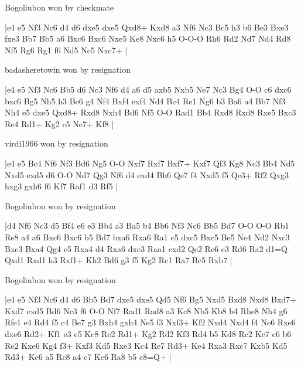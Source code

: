 \showboard

Bogoliubon won by checkmate

\makegametitle
|e4 e5 Nf3 Nc6 d4 d6 dxe5 dxe5 Qxd8+ Kxd8 a3 Nf6 Nc3 Bc5 h3 b6 Be3 Bxe3 fxe3 Bb7 Bb5 a6 Bxc6 Bxc6 Nxe5 Ke8 Nxc6 h5 O-O-O Rh6 Rd2 Nd7 Nd4 Rd8 Nf5 Rg6 Rg1 f6 Nd5 Nc5 Nxc7+  |

\showboard

badasheretowin won by resignation

\makegametitle
|e4 e5 Nf3 Nc6 Bb5 d6 Nc3 Nf6 d4 a6 d5 axb5 Nxb5 Ne7 Nc3 Bg4 O-O c6 dxc6 bxc6 Bg5 Nh5 h3 Be6 g4 Nf4 Bxf4 exf4 Nd4 Bc4 Re1 Ng6 b3 Ba6 a4 Bb7 Nf3 Nh4 e5 dxe5 Qxd8+ Rxd8 Nxh4 Bd6 Nf5 O-O Rad1 Bb4 Rxd8 Rxd8 Rxe5 Bxc3 Re4 Rd1+ Kg2 c5 Ne7+ Kf8  |

\showboard

virdi1966 won by resignation

\makegametitle
|e4 e5 Bc4 Nf6 Nf3 Bd6 Ng5 O-O Nxf7 Rxf7 Bxf7+ Kxf7 Qf3 Kg8 Nc3 Bb4 Nd5 Nxd5 exd5 d6 O-O Nd7 Qg3 Nf6 d4 exd4 Bh6 Qe7 f4 Nxd5 f5 Qe3+ Rf2 Qxg3 hxg3 gxh6 f6 Kf7 Raf1 d3 Rf5  |

\showboard

Bogoliubon won by resignation

\makegametitle
|d4 Nf6 Nc3 d5 Bf4 e6 e3 Bb4 a3 Ba5 b4 Bb6 Nf3 Nc6 Bb5 Bd7 O-O O-O Rb1 Re8 a4 a6 Bxc6 Bxc6 b5 Bd7 bxa6 Rxa6 Ra1 c5 dxc5 Bxc5 Be5 Ne4 Nd2 Nxc3 Bxc3 Bxa4 Qg4 e5 Rxa4 d4 Rxa6 dxc3 Raa1 cxd2 Qe2 Re6 c3 Rd6 Ra2 d1=Q Qxd1 Rxd1 h3 Rxf1+ Kh2 Bd6 g3 f5 Kg2 Rc1 Ra7 Bc5 Rxb7  |

\showboard

Bogoliubon won by resignation

\makegametitle
|e4 e5 Nf3 Nc6 d4 d6 Bb5 Bd7 dxe5 dxe5 Qd5 Nf6 Bg5 Nxd5 Bxd8 Nxd8 Bxd7+ Kxd7 exd5 Bd6 Nc3 f6 O-O Nf7 Rad1 Rad8 a3 Kc8 Nb5 Kb8 b4 Rhe8 Nh4 g6 Rfe1 e4 Rd4 f5 c4 Be7 g3 Bxh4 gxh4 Ne5 f3 Nxf3+ Kf2 Nxd4 Nxd4 f4 Ne6 Rxe6 dxe6 Rd2+ Kf1 e3 c5 Kc8 Re2 Rd1+ Kg2 Rd2 Kf3 Rd4 b5 Kd8 Rc2 Ke7 c6 b6 Re2 Kxe6 Kg4 f3+ Kxf3 Kd5 Rxe3 Kc4 Re7 Rd3+ Ke4 Rxa3 Rxc7 Kxb5 Kd5 Rd3+ Ke6 a5 Rc8 a4 c7 Kc6 Ra8 b5 c8=Q+  |


